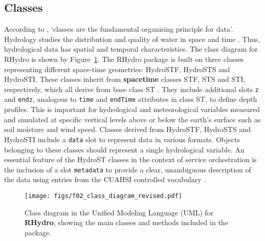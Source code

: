 \documentclass{icldt}\usepackage[]{graphicx}\usepackage[]{color}
\begin{document}

\subsection{Classes}
According to \citet{chambers1998}, `classes are the fundamental organising principle for data'. Hydrology studies the distribution and quality of water in space and time \citep{}. Thus, hydrological data has spatial and temporal characteristics. The class diagram for RHydro is shown by Figure~\ref{fig:classdiagram}. The RHydro package is built on three classes representing different space-time geometries: HydroSTF, HydroSTS and HydroSTI. These classes inherit from \textbf{spacetime} classes STF, STS and STI, respectively, which all derive from base class ST \citep{pebesma2012}. They include additional slots \texttt{z} and \texttt{endz}, analogous to \texttt{time} and \texttt{endTime} attributes in class ST, to define depth profiles. This is important for hydrological and meteorological variables measured and simulated at specific vertical levels above or below the earth's surface such as soil moisture and wind speed. Classes derived from HydroSTF, HydroSTS and HydroSTI include a \texttt{data} slot to represent data in various formats. Objects belonging to these classes should represent a single hydrological variable. An essential feature of the HydroST classes in the context of service orchestration is the inclusion of a slot \texttt{metadata} to provide a clear, unambiguous description of the data using entries from the CUAHSI controlled vocabulary \citep{horsburgh2013}. \\


\begin{figure}[t]
  \texttt{[image: figs/f02\_class\_diagram\_revised.pdf]}
  \caption{Class diagram in the Unified Modeling Language (UML) for \textbf{RHydro}, showing the main classes and methods included in the package.}
  \label{fig:classdiagram}
\end{figure}
\end{document}
